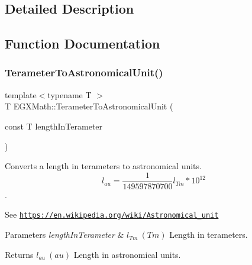 \subsection{Detailed Description}


\subsection{Function Documentation}
\mbox{\label{group___e_g_x_math-_conversions-_length_conversions-_terameter-_astronomical_gaddabc91d53862a8031cd5438aedb0ed2}} 
\subsubsection{\texorpdfstring{Terameter\+To\+Astronomical\+Unit()}{TerameterToAstronomicalUnit()}}
{\footnotesize\ttfamily template$<$typename T $>$ \\
T E\+G\+X\+Math\+::\+Terameter\+To\+Astronomical\+Unit (\begin{DoxyParamCaption}\item[{const T}]{length\+In\+Terameter }\end{DoxyParamCaption})}



Converts a length in terameters to astronomical units. \[ l_{au}= \frac{1}{149597870700} l_{Tm} * 10^{12} \]. 

See \href{https://en.wikipedia.org/wiki/Astronomical_unit}{\tt https\+://en.\+wikipedia.\+org/wiki/\+Astronomical\+\_\+unit} 
\begin{DoxyParams}{Parameters}
{\em length\+In\+Terameter} & $ l_{Tm}\ (Tm)$ Length in terameters. \\
\hline
\end{DoxyParams}
\begin{DoxyReturn}{Returns}
$ l_{au}\ (au)$ Length in astronomical units. 
\end{DoxyReturn}
\mbox{\label{group___e_g_x_math-_conversions-_length_conversions-_terameter-_astronomical_gaf8f6953b6ef57246e02ab136d74ee7a8}} 

